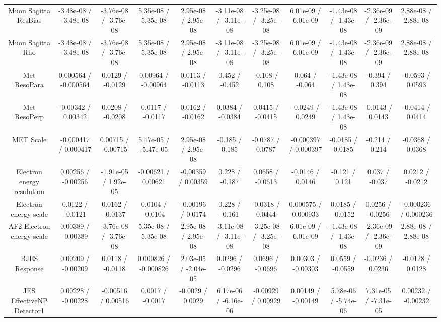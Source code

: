 \begin{table}[htbp]
\begin{center}
\begin{tabular}{|c|c|c|c|c|c|c|c|c|c|c|}
  Muon Sagitta ResBias & -3.48e-08 / -3.48e-08 & -3.76e-08 / -3.76e-08 & 5.35e-08 / 5.35e-08 & 2.95e-08 / 2.95e-08 & -3.11e-08 / -3.11e-08 & -3.25e-08 / -3.25e-08 & 6.01e-09 / 6.01e-09 & -1.43e-08 / -1.43e-08 & -2.36e-09 / -2.36e-09 & 2.88e-08 / 2.88e-08 \\ 
  Muon Sagitta Rho & -3.48e-08 / -3.48e-08 & -3.76e-08 / -3.76e-08 & 5.35e-08 / 5.35e-08 & 2.95e-08 / 2.95e-08 & -3.11e-08 / -3.11e-08 & -3.25e-08 / -3.25e-08 & 6.01e-09 / 6.01e-09 & -1.43e-08 / -1.43e-08 & -2.36e-09 / -2.36e-09 & 2.88e-08 / 2.88e-08 \\ 
  Met ResoPara & 0.000564 / -0.000564 & 0.0129 / -0.0129 & 0.00964 / -0.00964 & 0.0113 / -0.0113 & 0.452 / -0.452 & -0.108 / 0.108 & 0.064 / -0.064 & -1.43e-08 / 1.43e-08 & -0.394 / 0.394 & -0.0593 / 0.0593 \\ 
  Met ResoPerp & -0.00342 / 0.00342 & 0.0208 / -0.0208 & 0.0117 / -0.0117 & 0.0162 / -0.0162 & 0.0384 / -0.0384 & 0.0415 / -0.0415 & -0.0249 / 0.0249 & -1.43e-08 / 1.43e-08 & -0.0143 / 0.0143 & -0.0414 / 0.0414 \\ 
  MET Scale & -0.000417 / 0.000417 & 0.00715 / -0.00715 & 5.47e-05 / -5.47e-05 & 2.95e-08 / 2.95e-08 & -0.185 / 0.185 & -0.0787 / 0.0787 & -0.000397 / 0.000397 & -0.0185 / 0.0185 & -0.214 / 0.214 & -0.0368 / 0.0368 \\ 
  Electron energy resolution & 0.00256 / -0.00256 & -1.91e-05 / 1.92e-05 & -0.00621 / 0.00621 & -0.00359 / 0.00359 & 0.228 / -0.187 & 0.0658 / -0.0613 & -0.0146 / 0.0146 & -0.121 / 0.121 & 0.037 / -0.037 & 0.0212 / -0.0212 \\ 
  Electron energy scale & 0.0122 / -0.0121 & 0.0162 / -0.0137 & 0.0104 / -0.0104 & -0.00196 / 0.0174 & 0.228 / -0.161 & -0.0318 / 0.0444 & 0.000575 / 0.000933 & 0.0185 / -0.0152 & 0.0256 / -0.0256 & -0.000236 / 0.000236 \\ 
  AF2 Electron energy scale & 0.00389 / -0.00389 & -3.76e-08 / -3.76e-08 & 5.35e-08 / 5.35e-08 & 2.95e-08 / 2.95e-08 & -3.11e-08 / -3.11e-08 & -3.25e-08 / -3.25e-08 & 6.01e-09 / 6.01e-09 & -1.43e-08 / -1.43e-08 & -2.36e-09 / -2.36e-09 & 2.88e-08 / 2.88e-08 \\ 
  BJES Response & 0.00209 / -0.00209 & 0.0118 / -0.0118 & 0.000826 / -0.000826 & 2.03e-05 / -2.04e-05 & 0.0296 / -0.0296 & 0.0696 / -0.0696 & 0.00303 / -0.00303 & 0.0559 / -0.0559 & -0.0236 / 0.0236 & -0.0128 / 0.0128 \\ 
  JES EffectiveNP Detector1 & 0.00228 / -0.00228 & -0.00516 / 0.00516 & 0.0017 / -0.0017 & -0.0029 / 0.0029 & 6.17e-06 / -6.16e-06 & -0.00929 / 0.00929 & 0.00149 / -0.00149 & 5.78e-06 / -5.74e-06 & 7.31e-05 / -7.31e-05 & 0.00232 / -0.00232 \\ 

\end{tabular}
\end{center}
\end{table}
